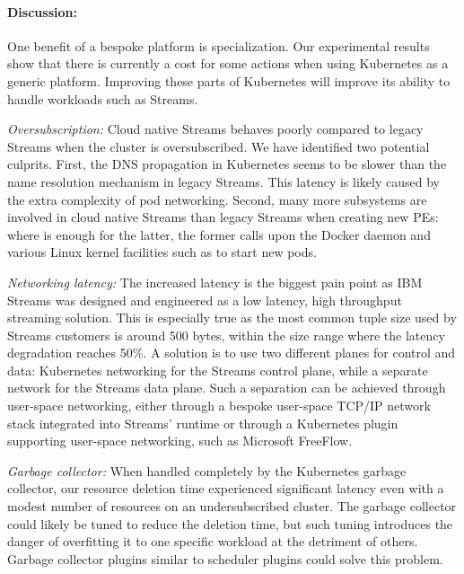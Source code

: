 \paragraph{Discussion:}

One benefit of a bespoke platform is specialization. Our experimental results
show that there is currently a cost for some actions when using Kubernetes as
a generic platform. Improving these parts of Kubernetes will improve
its ability to handle workloads such as Streams.

\emph{Oversubscription:} Cloud native Streams behaves poorly compared to legacy
Streams when the cluster is oversubscribed.  We have identified two potential
culprits.  First, the DNS propagation in Kubernetes seems to be slower than the
name resolution mechanism in legacy Streams. This latency is likely caused by
the extra complexity of pod networking. Second, many more subsystems are
involved in cloud native Streams than legacy Streams when creating new PEs:
where  is enough for the latter, the former calls upon the Docker
daemon and various Linux kernel facilities such as  to start new
pods.

\emph{Networking latency:} The increased latency is the biggest pain point as
IBM Streams was designed and engineered as a low latency, high throughput
streaming solution. This is especially true as the most common tuple size used
by Streams customers is around 500 bytes, within the size range where the
latency degradation reaches 50\%. A solution is to use two different planes for
control and data: Kubernetes networking for the Streams control plane, while a
separate network for the Streams data plane. Such a separation can be achieved
through user-space networking, either through a bespoke user-space TCP/IP
network stack integrated into Streams' runtime or through a Kubernetes plugin
supporting user-space networking, such as Microsoft FreeFlow\cite{freeflow}.

\emph{Garbage collector:} When handled completely by the Kubernetes garbage
collector, our resource deletion time experienced significant latency even with
a modest number of resources on an undersubscribed cluster. The garbage
collector could likely be tuned to reduce the deletion time, but such tuning
introduces the danger of overfitting it to one specific workload at the
detriment of others. Garbage collector plugins similar to scheduler plugins
could solve this problem.

